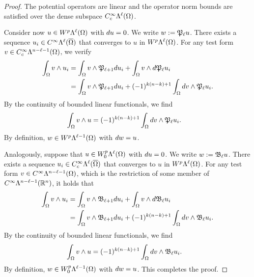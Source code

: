 \documentclass[10pt,letterpaper]{article}
\begin{document}
\begin{proof}
    The potential operators are linear and the operator norm bounds are satisfied over the dense subspace $C^{\infty}_{c}\Lambda^{\ell}(\Omega)$.
    
    Consider now $u \in W^{p}\Lambda^{\ell}(\Omega)$ with $d u = 0$. 
    We write $w := {\mathfrak P}_{\ell  } u$. 
    There exists a sequence $u_{i} \in C^{\infty}\Lambda^{\ell}(\overline\Omega)$ that converges to $u$ in $W^{p}\Lambda^{\ell}(\Omega)$. 
    For any test form $v \in C^{\infty}_{c}\Lambda^{n-\ell-1}(\Omega)$, we verify 
    \begin{align*}
        \int_{\Omega} v \wedge u_{i} 
        &=
        \int_{\Omega} v \wedge {\mathfrak P}_{\ell+1} d u_{i}
        +
        \int_{\Omega} v \wedge d {\mathfrak P}_{\ell  } u_{i}
        \\&=
        \int_{\Omega} v \wedge {\mathfrak P}_{\ell+1} d u_{i}
        +
        (-1)^{k(n-k)+1}
        \int_{\Omega} d v \wedge {\mathfrak P}_{\ell  } u_{i}
        .
    \end{align*}
    By the continuity of bounded linear functionals, we find 
    \begin{align*}
        \int_{\Omega} v \wedge u 
        &=
        (-1)^{k(n-k)+1}
        \int_{\Omega} d v \wedge {\mathfrak P}_{\ell  } u_{i}
        .
    \end{align*}
    By definition, $w \in W^{p}\Lambda^{\ell-1}(\Omega)$ with $d w = u$.
    
    
    Analogously, suppose that $u \in W^{p}_{0}\Lambda^{\ell}(\Omega)$ with $d u = 0$. 
    We write $w := {\mathfrak B}_{\ell} u$. 
    There exists a sequence $u_{i} \in C^{\infty}_{c}\Lambda^{\ell}(\overline\Omega)$ that converges to $u$ in $W^{p}\Lambda^{\ell}(\Omega)$. 
    For any test form $v \in C^{\infty}\Lambda^{n-\ell-1}(\Omega)$, 
    which is the restriction of some member of $C^{\infty}\Lambda^{n-\ell-1}({\mathbb R}^{n})$, 
    it holds that 
    \begin{align*}
        \int_{\Omega} v \wedge u_{i} 
        &=
        \int_{\Omega} v \wedge {\mathfrak B}_{\ell+1} d u_{i}
        +
        \int_{\Omega} v \wedge d {\mathfrak B}_{\ell  } u_{i}
        \\&=
        \int_{\Omega} v \wedge {\mathfrak B}_{\ell+1} d u_{i}
        +
        (-1)^{k(n-k)+1}
        \int_{\Omega} d v \wedge {\mathfrak B}_{\ell  } u_{i}
        .
    \end{align*}
    By the continuity of bounded linear functionals, we find 
    \begin{align*}
        \int_{\Omega} v \wedge u 
        &=
        (-1)^{k(n-k)+1}
        \int_{\Omega} d v \wedge {\mathfrak B}_{\ell  } u_{i}
        .
    \end{align*}
    By definition, $w \in W^{p}_{0}\Lambda^{\ell-1}(\Omega)$ with $d w = u$.
    This completes the proof. 
\end{proof}
\end{document}
